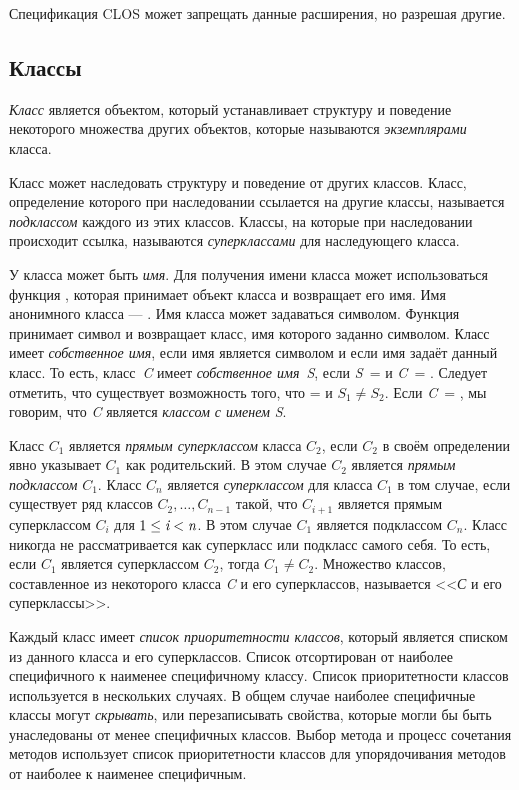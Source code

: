 Спецификация CLOS может запрещать данные расширения, но разрешая другие. 

\subsection{Классы}
\label{Classes-SECTION}

\emph{Класс} является объектом, который устанавливает структуру и поведение
некоторого множества других объектов, которые называются \emph{экземплярами}
класса.

Класс может наследовать структуру и поведение от других классов.
Класс, определение которого при наследовании ссылается на другие классы,
называется \emph{подклассом} каждого из этих классов. Классы, на которые при
наследовании происходит ссылка, называются \emph{суперклассами} для наследующего
класса.

У класса может быть \emph{имя}. Для получения имени класса может использоваться
функция , которая принимает объект класса и
возвращает его имя. Имя анонимного класса --- . Имя класса может
задаваться символом. Функция  принимает символ и возвращает класс, имя
которого заданно символом. Класс имеет \emph{собственное имя}, если имя является
символом и если имя задаёт данный класс. То есть, класс~\emph{C} имеет
\emph{собственное имя}~\emph{S}, если \emph{S}~=  и
\emph{C}~= . Следует отметить, что существует
возможность того, что  =  и
$S_1\neq S_2$.
Если \emph{C}~= , мы говорим, что \emph{C} является
\emph{классом с именем} \emph{S}.

Класс $C_1$ является \emph{прямым суперклассом} класса $C_2$, если $C_2$ в своём
определении явно указывает $C_1$ как родительский. В этом случае $C_2$ является
\emph{прямым подклассом} $C_1$. Класс $C_n$ является \emph{суперклассом} для
класса $C_1$ в том случае, если существует ряд классов $C_{2},\ldots,C_{n-1}$
такой, что $C_{i+1}$ является прямым суперклассом $C_i$ для $1 \leq \emph{i} <
\emph{n}$. В этом случае $C_1$ является подклассом $C_n$. Класс никогда не
рассматривается как суперкласс или подкласс самого себя. То есть, если $C_1$
является суперклассом $C_2$, тогда $C_{1} \neq C_{2}$. Множество классов,
составленное из некоторого класса \emph{C} и его суперклассов, называется
<<\emph{С} и его суперклассы>>.

Каждый класс имеет \emph{список приоритетности классов}, который является списком
из данного класса и его суперклассов.
Список отсортирован от наиболее
специфичного к наименее специфичному классу.
Список приоритетности классов используется в нескольких случаях. В общем случае
наиболее специфичные классы могут \emph{скрывать}, или перезаписывать свойства,
которые могли бы быть унаследованы от менее специфичных классов. Выбор метода и
процесс сочетания методов использует список приоритетности классов для
упорядочивания методов от наиболее к наименее специфичным.

